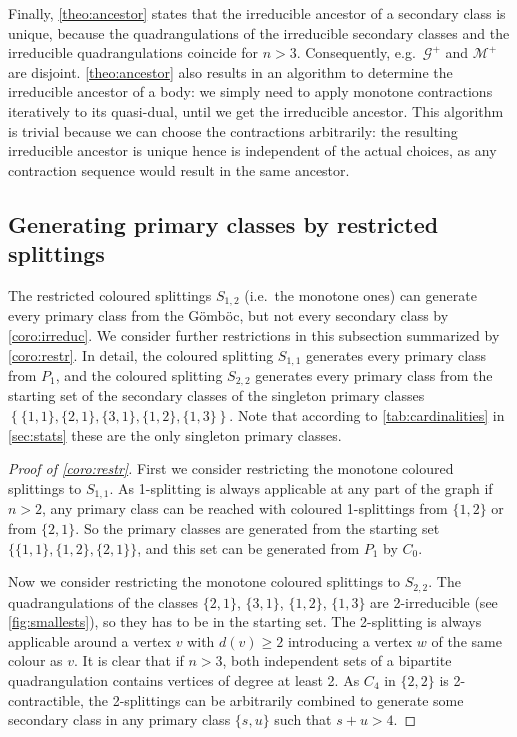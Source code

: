 \documentclass[]{article}
\newcommand{\col}{$\mathcal{G}^+$\xspace}
\newcommand{\Gomboc}{Gömböc\xspace}
\begin{document}
Finally, \autoref{theo:ancestor} states that the irreducible ancestor of a secondary class is unique, because the quadrangulations of the irreducible secondary classes and the irreducible quadrangulations coincide for $n>3$.
Consequently, e.g.\  \col and $\mathcal{M}^+$ are disjoint.
\autoref{theo:ancestor} also results in an algorithm to determine the irreducible ancestor of a body:
we simply need to apply monotone contractions iteratively to its quasi-dual, until we get the irreducible ancestor.
This algorithm is trivial because we can choose the contractions arbitrarily: the resulting irreducible ancestor is unique hence is independent of the actual choices, as any contraction sequence would result in the same ancestor.


\subsection{Generating primary classes by restricted splittings}

The restricted coloured splittings $S_{1,2}$ (i.e.\  the monotone ones) can generate every primary class from the \Gomboc \cite{Domokos2006}, but not every secondary class by \autoref{coro:irreduc}.
We consider further restrictions in this subsection summarized by \autoref{coro:restr}.
In detail, the coloured splitting $S_{1,1}$ generates every primary class from $P_1$, and the coloured splitting $S_{2,2}$ generates every primary class from the starting set of the secondary classes of the singleton primary classes $\left\{\{1,1\},\{2,1\}, \{3,1\},\{1,2\},\{1,3\}\right\}$.
Note that according to \autoref{tab:cardinalities} in \autoref{sec:stats} these are the only singleton primary classes.

\begin{proof}[Proof of \autoref*{coro:restr}]
First we consider restricting the monotone coloured splittings to $S_{1,1}$.
As 1-splitting is always applicable at any part of the graph if $n>2$, any primary class can be reached with coloured 1-splittings from $\{1,2\}$ or from $\{2,1\}$.
So the primary classes are generated from the starting set $\{\{1,1\},\{1,2\},\{2,1\}\}$, and this set can be generated from $P_1$ by $C_0$.


Now we consider restricting the monotone coloured splittings to $S_{2,2}$.
The quadrangulations of the classes $\{2,1\}$, $\{3,1\}$, $\{1,2\}$, $\{1,3\}$ are 2-irreducible (see \autoref{fig:smallests}), so they has to be in the starting set.
The 2-splitting is always applicable around a vertex $v$ with $d(v)\geq 2$ introducing a vertex $w$ of the same colour as $v$.
It is clear that if $n>3$, both independent sets of a bipartite quadrangulation contains vertices of degree at least 2.
As $C_4$ in $\{2,2\}$ is 2-contractible, the 2-splittings can be arbitrarily combined to generate some secondary class in any primary class $\{s,u\}$ such that $s+u>4$.
\end{proof}
\end{document}
